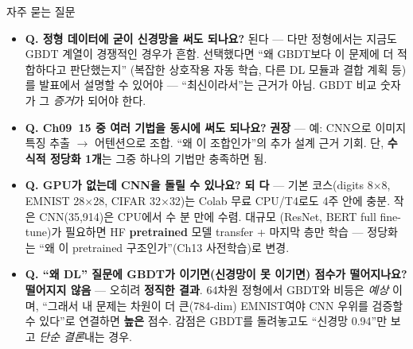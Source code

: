 \begin{frame}{자주 묻는 질문}
  \small
  \begin{itemize}
    \item \textbf{Q. 정형 데이터에 굳이 신경망을 써도 되나요?} \;
      된다 — 다만 정형에서는 지금도 GBDT 계열이 경쟁적인 경우가 흔함.
      선택했다면 ``왜 GBDT보다 이 문제에 더 적합하다고 판단했는지''
      (복잡한 상호작용 자동 학습, 다른 DL 모듈과 결합 계획 등)를
      발표에서 설명할 수 있어야 — ``최신이라서''는 근거가 아님.
      GBDT 비교 숫자가 그 \textit{증거}가 되어야 한다.
    \item \textbf{Q. Ch09~15 중 여러 기법을 동시에 써도 되나요?} \;
      \textbf{권장} — 예: CNN으로 이미지 특징 추출 $\to$ 어텐션으로
      조합. ``왜 이 조합인가''의 추가 설계 근거 기회. 단,
      \textbf{수식적 정당화 1개}는 그중 하나의 기법만 충족하면 됨.
    \item \textbf{Q. GPU가 없는데 CNN을 돌릴 수 있나요?} \; \textbf{되
      다} — 기본 코스(digits 8$\times$8, EMNIST 28$\times$28,
      CIFAR 32$\times$32)는 Colab 무료 CPU/T4로도 4주 안에 충분.
      작은 CNN(35,914)은 CPU에서 수 분 만에 수렴. 대규모
      (ResNet, BERT full fine-tune)가 필요하면 HF \textbf{pretrained}
      모델 transfer + 마지막 층만 학습 — 정당화는 ``왜 이 pretrained
      구조인가''(Ch13 사전학습)로 변경.
    \item \textbf{Q. ``왜 DL'' 질문에 GBDT가 이기면(신경망이 못
      이기면) 점수가 떨어지나요?} \; \textbf{떨어지지 않음} — 오히려
      \textbf{정직한 결과}. 64차원 정형에서 GBDT와 비등은 \textit{예상
      }이며, ``그래서 내 문제는 차원이 더 큰(784-dim) EMNIST여야 CNN
      우위를 검증할 수 있다''로 연결하면 \textbf{높은} 점수.
      감점은 GBDT를 돌려놓고도 ``신경망 0.94''만 보고 \textit{단순
      결론}내는 경우.
  \end{itemize}
\end{frame}
